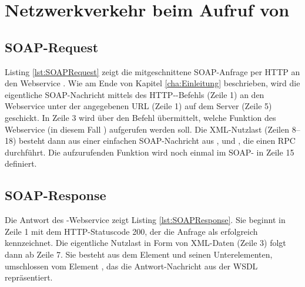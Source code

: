 \section{Netzwerkverkehr beim Aufruf von }

\subsection{SOAP-Request}
Listing \ref{lst:SOAPRequest} zeigt die mitgeschnittene SOAP-Anfrage per HTTP an den Webservice . Wie am Ende von Kapitel \ref{cha:Einleitung} beschrieben, wird die eigentliche SOAP-Nachricht mittels des HTTP--Befehls (Zeile 1) an den Webservice unter der angegebenen URL (Zeile 1) auf dem Server (Zeile 5) geschickt. In Zeile 3 wird über den Befehl  übermittelt, welche Funktion des Webservice (in diesem Fall ) aufgerufen werden soll. Die XML-Nutzlast (Zeilen 8--18) besteht dann aus einer einfachen SOAP-Nachricht aus ,  und , die einen RPC durchführt. Die aufzurufenden Funktion wird noch einmal im SOAP- in Zeile 15 definiert.


\lstset{language=XML, basicstyle=\footnotesize, showstringspaces=false, tabsize=2}


\subsection{SOAP-Response}
Die Antwort des -Webservice zeigt Listing \ref{lst:SOAPResponse}. Sie beginnt in Zeile 1 mit dem HTTP-Statuscode 200, der die Anfrage als erfolgreich kennzeichnet. Die eigentliche Nutzlast in Form von XML-Daten (Zeile 3) folgt dann ab Zeile 7. Sie besteht aus dem Element  und seinen Unterelementen, umschlossen vom Element , das die Antwort-Nachricht aus der WSDL repräsentiert.

\lstset{language=XML, basicstyle=\footnotesize, showstringspaces=false, tabsize=2}

